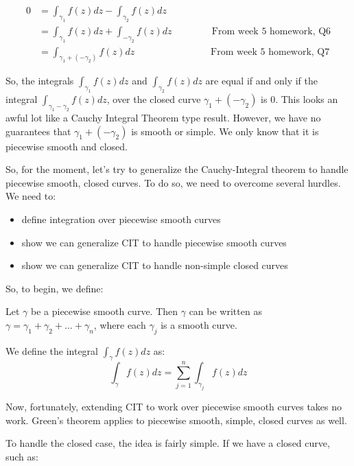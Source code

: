 \begin{align*}0 &= \int_{\gamma_1} f(z)dz - \int_{\gamma_2}f(z)dz\\
&= \int_{\gamma_1} f(z)dz + \int_{-\gamma_2} f(z)dz \hspace{50pt} \text{From week 5 homework, Q6}\\
&= \int_{\gamma_1 + (-\gamma_2)}f(z)dz \hspace{95pt}\text{From week 5 homework, Q7}
\end{align*}

So, the integrals $\int_{\gamma_1}f(z)dz$ and $\int_{\gamma_2}f(z)dz$ are equal if and only if the integral $\int_{\gamma_1 - \gamma_2}f(z)dz$, over the closed curve $\gamma_1 + (-\gamma_2)$ is $0$. This looks an awful lot like a Cauchy Integral Theorem type result. However, we have no guarantees that $\gamma_1 + (-\gamma_2)$ is smooth or simple. We only know that it is piecewise smooth and closed.

So, for the moment, let's try to generalize the Cauchy-Integral theorem to handle piecewise smooth, closed curves. To do so, we need to overcome several hurdles. We need to:

\begin{itemize}
\item define integration over piecewise smooth curves
\item show we can generalize CIT to handle piecewise smooth curves
\item show we can generalize CIT to handle non-simple closed curves
\end{itemize}

So, to begin, we define:

\begin{defbo}{}{}Let $\gamma$ be a piecewise smooth curve. Then $\gamma$ can be written as $\gamma = \gamma_1 + \gamma_2 + \dots + \gamma_n$, where each $\gamma_j$ is a smooth curve.

We define the integral $\int_{\gamma}f(z)dz$ as:
$$\int_{\gamma}f(z)dz = \sum_{j = 1}^n \int_{\gamma_j}f(z)dz$$
\end{defbo}

Now, fortunately, extending CIT to work over piecewise smooth curves takes no work. Green's theorem applies to piecewise smooth, simple, closed curves as well.

To handle the closed case, the idea is fairly simple. If we have a closed curve, such as:

\begin{center}
\end{center}

